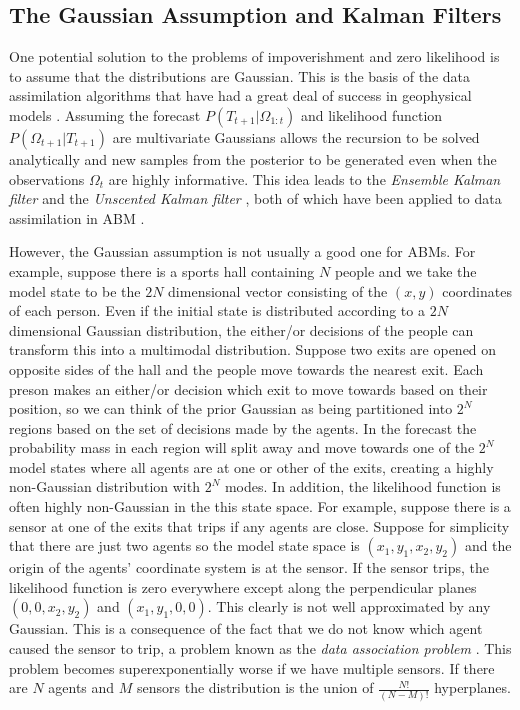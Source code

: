 \documentclass{article}
\begin{document}
\subsection{The Gaussian Assumption and Kalman Filters}

One potential solution to the problems of impoverishment and zero likelihood is to assume that the distributions are Gaussian. This is the basis of the data assimilation algorithms that have had a great deal of success in geophysical models \citep*{carrassi2018data, talagrand_assimilation_1997, kalnay_atmospheric_2003, lewis_dynamic_2006}. Assuming the forecast $P(T_{t+1}|\Omega_{1:t})$ and likelihood function $P(\Omega_{t+1}|T_{t+1})$ are multivariate Gaussians allows the recursion to be solved analytically and new samples from the posterior to be generated even when the observations $\Omega_t$ are highly informative. This idea leads to the \textit{Ensemble Kalman filter} \citep{evensen2003ensemble} and the \textit{Unscented Kalman filter} \citep{wan2001unscented}, both of which have been applied to data assimilation in ABM \citep*{ward_dynamic_2016, clay_realtime_2020}.

However, the Gaussian assumption is not usually a good one for ABMs. For example, suppose there is a sports hall containing $N$ people and we take the model state to be the $2N$ dimensional vector consisting of the $(x,y)$ coordinates of each person. Even if the initial state is distributed according to a $2N$ dimensional Gaussian distribution, the either/or decisions of the people can transform this into a multimodal distribution. Suppose two exits are opened on opposite sides of the hall and the people move towards the nearest exit. Each preson makes an either/or decision which exit to move towards based on their position, so we can think of the prior Gaussian as being partitioned into $2^N$ regions based on the set of decisions made by the agents. In the forecast the probability mass in each region will split away and move towards one of the $2^N$ model states where all agents are at one or other of the exits, creating a highly non-Gaussian distribution with $2^N$ modes. In addition, the likelihood function is often highly non-Gaussian in the this state space. For example, suppose there is a sensor at one of the exits that trips if any agents are close. Suppose for simplicity that there are just two agents so the model state space is $(x_1,y_1,x_2,y_2)$ and the origin of the agents' coordinate system is at the sensor. If the sensor trips, the likelihood function is zero everywhere except along the perpendicular planes $(0,0,x_2,y_2)$ and $(x_1,y_1,0,0)$. This clearly is not well approximated by any Gaussian. This is a consequence of the fact that we do not know which agent caused the sensor to trip, a problem known as the \textit{data association problem} \citep{lueck_who_2019}. This problem becomes superexponentially worse if we have multiple sensors. If there are $N$ agents and $M$ sensors the distribution is the union of $\frac{N!}{(N-M)!}$ hyperplanes.
\end{document}
